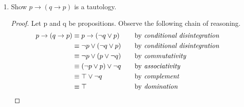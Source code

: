 \documentclass{article}
\begin{document}
\begin {enumerate}
\begin{enumerate}
        \vspace{2ex}
        \begin{proof}
        Let p and q be propositions. Observe the following chain of reasoning.
        \begin{align*}
        (p \rightarrow q) \rightarrow (\neg q \rightarrow \neg p)
          &\equiv(\neg p \lor q) \rightarrow  (\neg(\neg q) \lor \neg p)
            &\quad
            &\text{by \emph{conditional disintegration}}\times2
            \\
          &\equiv(\neg p \lor q) \rightarrow  (q \lor \neg p)
            &\quad
            &\text{by \emph{double negation}}
            \\
          &\equiv(\neg p \lor q) \rightarrow  (\neg p \lor q)
            &\quad
            &\text{by \emph{commutativity}}
            \\
          &\equiv \neg(\neg p \lor q) \lor  (\neg p \lor q)
            &\quad
            &\text{by \emph{conditional disintegration}}
            \\
          &\equiv \top
            &\quad
            &\text{by \emph{complement}}
            \\
        \end{align*}
        Therefore, $(p \rightarrow q) \rightarrow  (\neg q \rightarrow \neg p)$ is a tautology.
        \end{proof}
\pagebreak
      \item
        Show $p \rightarrow (q \rightarrow p)$ is a tautology.

        \vspace{2ex}
        \begin{proof}
        Let p and q be propositions. Observe the following chain of reasoning.
        \begin{align*}
          p \rightarrow (q \rightarrow p)
            &\equiv p \rightarrow (\neg q \lor p)
              &\quad
              &\text{by \emph{conditional disintegration}} 
              \\
            &\equiv \neg p \lor (\neg q \lor p)
              &\quad
              &\text{by \emph{conditional disintegration}} 
              \\
            &\equiv \neg p \lor (p \lor \neg q)
              &\quad
              &\text{by \emph{commutativity}} 
              \\
            &\equiv (\neg p \lor p)\lor \neg q
              &\quad
              &\text{by \emph{associativity}} 
              \\
            &\equiv \top\lor \neg q
              &\quad
              &\text{by \emph{complement}} 
              \\
            &\equiv \top
              &\quad
              &\text{by \emph{domination}} 
              \\
        \end{align*}
        

\end{proof}
\end{enumerate}
\end{enumerate}
\end{document}
